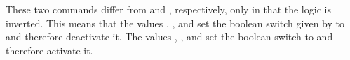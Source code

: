 \begin{Declaration}
\end{Declaration}
These two commands differ from
 and
, respectively, only in that the
logic is inverted. This means that the values , , and
 set the boolean switch given by  to
 and therefore deactivate it. The values ,
, and  set the boolean switch to  and
therefore activate it.%
\EndIndexGroup


